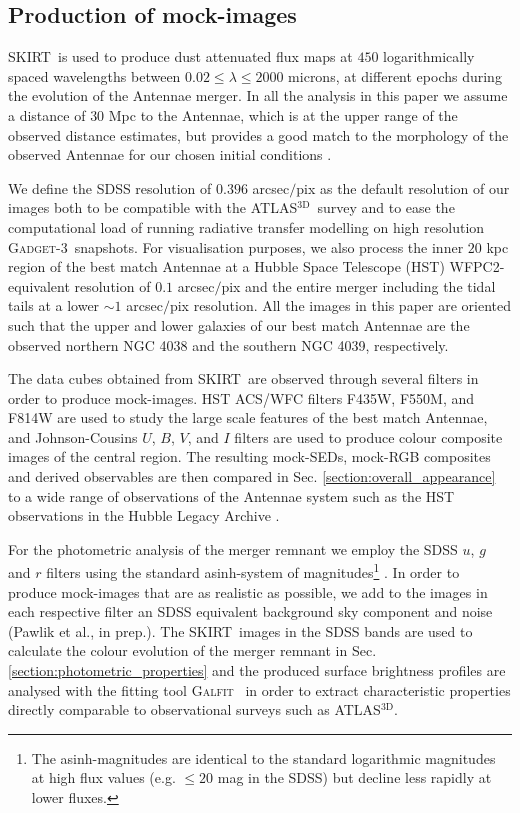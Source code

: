 \documentclass[a4paper,fleqn,usenatbib]{mnras}
\newcommand{\atlas}{\textsc{ATLAS$^\mathrm{3D}$}}
\newcommand{\gadget}{\textsc{Gadget-3}}
\newcommand{\skirt}{\textsc{SKIRT}}
\newcommand{\galfit}{\textsc{Galfit}}
\begin{document}
\subsection{Production of mock-images}\label{section:skirt_filters}

\skirt\ is used to produce dust attenuated flux maps at $450$ logarithmically 
spaced wavelengths between $0.02\le \lambda \le 2000$ microns, at different epochs during the 
evolution of the Antennae merger. In all the analysis in this paper we assume a 
distance of $30$ Mpc to the Antennae, which is at the upper range of the observed 
distance estimates, but provides a good match to the morphology of the observed 
Antennae for our chosen initial conditions \citep{2010ApJ...715L..88K}. 

We define the SDSS resolution of $0.396$ arcsec$/$pix as the default resolution of our images both to be
compatible with the \atlas\ survey and to ease the computational load of running
radiative transfer modelling on high resolution \gadget\ snapshots. 
For visualisation purposes, we also process the inner $20$ kpc region of the best match 
Antennae at a Hubble Space Telescope (HST) 
WFPC2-equivalent resolution of $0.1$ arcsec$/$pix and the entire merger including the 
tidal tails at a lower $\sim1$ arcsec$/$pix resolution.
All the images in this paper are oriented such that the upper
and lower galaxies of our best match Antennae
are the observed northern NGC 4038 and the southern NGC 4039, respectively. 

The data cubes obtained from \skirt\ are observed through several filters 
in order to produce mock-images. HST ACS/WFC filters 
F435W, F550M, and F814W 
are used to study the large scale features of the 
best match Antennae, and Johnson-Cousins $U$, $B$, $V$, and $I$ filters 
\citep{1998A&A...333..231B} are used to produce colour composite images of the 
central region. 
The resulting mock-SEDs, mock-RGB composites and derived observables are then compared in 
Sec. \ref{section:overall_appearance} to a wide range of 
observations of the Antennae system such as the HST observations in the Hubble Legacy Archive \citep{1999AJ....118.1551W}.

For the photometric analysis of the merger remnant we employ the SDSS $u$, $g$ and $r$ 
filters using the standard asinh-system of magnitudes\footnote{The asinh-magnitudes are identical to 
the standard logarithmic magnitudes at high flux values (e.g. $\le 20$ mag in the SDSS) but decline less 
rapidly at lower fluxes.} \citep{1999AJ....118.1406L}. 
In order to produce mock-images that are as realistic as possible, we add to the images in each respective
filter an SDSS equivalent background sky component and noise (Pawlik et al., in prep.).
The \skirt\ images in the SDSS bands are used to calculate the colour evolution of the
merger remnant in Sec. \ref{section:photometric_properties} and the produced surface brightness 
profiles are analysed with the fitting tool \galfit\ \citep{2010AJ....139.2097P} in order to
extract characteristic properties directly comparable to observational surveys such as \atlas.
\end{document}
